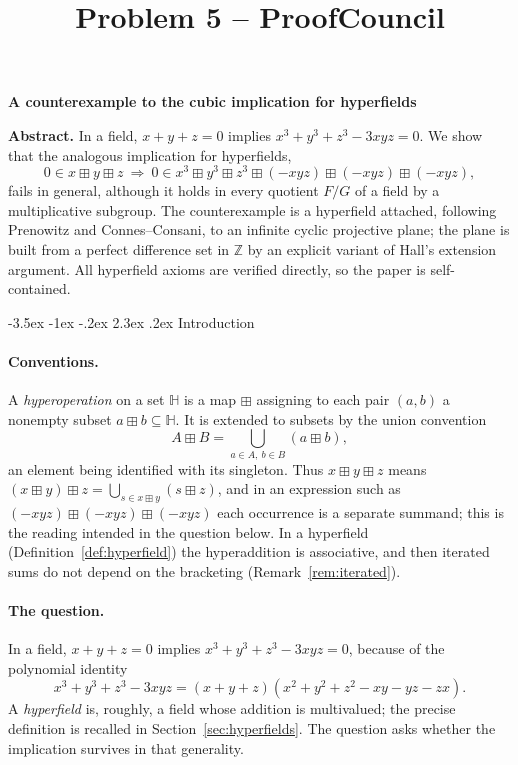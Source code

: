 \documentclass[12pt]{article}
\makeatletter
\renewcommand\section{\@startsection{section}{1}{\z@}%
  {-3.5ex \@plus -1ex \@minus -.2ex}%
  {2.3ex \@plus.2ex}%
  {\normalfont\bfseries}}
\theoremstyle{plain}
\theoremstyle{definition}
\newcommand{\Z}{\mathbb{Z}}
\newcommand{\Hh}{\mathbb{H}}
\newcommand{\bp}{\boxplus}
\makeatother
\begin{document}
\title{Problem 5 -- ProofCouncil}
\author{}
\date{}
\maketitle

\begin{center}
{\textbf{A counterexample to the cubic implication for hyperfields}}
\end{center}

\medskip
\noindent\textbf{Abstract.}
In a field, $x+y+z=0$ implies $x^3+y^3+z^3-3xyz=0$.  We show that the
analogous implication for hyperfields,
\[
 0\in x\bp y\bp z
 \ \Longrightarrow\
 0\in x^3\bp y^3\bp z^3\bp(-xyz)\bp(-xyz)\bp(-xyz),
\]
fails in general, although it holds in every quotient $F/G$ of a field
by a multiplicative subgroup.  The counterexample is a hyperfield
attached, following Prenowitz and Connes--Consani, to an infinite
cyclic projective plane; the plane is built from a perfect difference
set in $\Z$ by an explicit variant of Hall's extension argument.  All
hyperfield axioms are verified directly, so the paper is
self-contained.

\section{Introduction}\label{sec:intro}

\paragraph{Conventions.}
A \emph{hyperoperation} on a set $\Hh$ is a map $\bp$ assigning to each
pair $(a,b)$ a nonempty subset $a\bp b\subseteq\Hh$.  It is extended to
subsets by the union convention
\begin{equation}\label{eq:union}
 A\bp B=\bigcup_{a\in A,\ b\in B}(a\bp b),
\end{equation}
an element being identified with its singleton.  Thus
$x\bp y\bp z$ means $(x\bp y)\bp z=\bigcup_{s\in x\bp y}(s\bp z)$, and
in an expression such as $(-xyz)\bp(-xyz)\bp(-xyz)$ each occurrence is a
separate summand; this is the reading intended in the question below.
In a hyperfield (Definition~\ref{def:hyperfield}) the hyperaddition is
associative, and then iterated sums do not depend on the bracketing
(Remark~\ref{rem:iterated}).

\paragraph{The question.}
In a field, $x+y+z=0$ implies $x^3+y^3+z^3-3xyz=0$, because of the
polynomial identity
\begin{equation}\label{eq:cubic}
 x^3+y^3+z^3-3xyz=(x+y+z)(x^2+y^2+z^2-xy-yz-zx).
\end{equation}
A \emph{hyperfield} is, roughly, a field whose addition is multivalued;
the precise definition is recalled in Section~\ref{sec:hyperfields}.
The question asks whether the implication survives in that generality.
\end{document}
